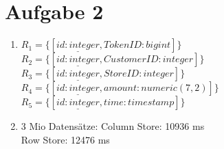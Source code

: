 \documentclass[a4paper]{article}
\begin{document}
\section*{Aufgabe 2}
\begin{enumerate}[label=\alph*)]

\item $R_1=\{[\underline{id:integer}, TokenID:bigint]\}$\\
			$R_2=\{[\underline{id:integer}, CustomerID:integer]\}$\\
			$R_3=\{[\underline{id:integer}, StoreID:integer]\}$\\
			$R_4=\{[\underline{id:integer}, amount:numeric(7,2)]\}$\\
			$R_5=\{[\underline{id:integer}, time:timestamp]\}$
\setcounter{enumi}{5}
\item 3 Mio Datensätze: Column Store: 10936 ms \\
			Row Store: 12476 ms

\end{enumerate}
\end{document}
